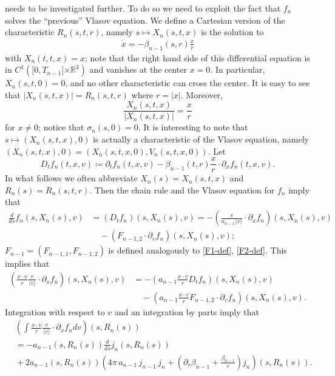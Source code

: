 \documentclass[11pt]{article}
\def\R{\mathbb R}
\def\p0{\langle v \rangle}
\begin{document}
needs to be investigated further.
To do so we need to exploit the fact that
$f_n$ solves the ``previous'' Vlasov equation.
We define a
Cartesian version of the characteristic $R_n(s,t,r)$, namely
$s\mapsto X_n(s,t,x)$ is the solution to
\begin{align}\label{X_nbeta}
\dot x = - \beta_{n-1}(s,r)\frac{x}{r}
\end{align}
with $X_n(t,t,x) = x$;
note that the right hand side of this differential equation
is in $C^1([0,T_{n-1}[\times \R^3)$ and vanishes at the center $x=0$. In
particular, $X_n(s,t,0)=0$, and no other characteristic can cross the center.
It is easy to see that $|X_n(s,t,x)|= R_n(s,t,r)$ where $r=|x|$.
Moreover,
\[
\frac{X_n(s,t,x)}{|X_n(s,t,x)|} = \frac{x}{r}
\]
for $x\neq 0$; notice that $\sigma_n(s,0)=0$.
It is interesting to note that $s\mapsto (X_n(s,t,x),0)$
is actually a characteristic
of the Vlasov equation, namely $(X_n(s,t,x),0)=(X_n(s,t,x,0),V_n(s,t,x,0))$.
Let
\[
D_t f_n(t,x,v) \coloneqq \partial_t f_n(t,x,v) -
\beta_{n-1}(t,r) \frac{x}{r}\cdot \partial_x f_n (t,x,v).
\]
In what follows we often abbreviate
$X_n(s) = X_n(s,t,x)$ and $R_n(s)=R_n(s,t,r)$.
Then the chain rule and the Vlasov equation for $f_n$ imply that
\begin{align*}
\frac{d}{ds} f_n(s,X_n(s),v)
&=
(D_t f_n)(s,X_n(s),v) =
-\left(\frac{v}{a_{n-1} \p0}\cdot \partial_x f_n\right)(s,X_n(s),v)\\
&\quad
{} - \left(F_{n-1,2} \cdot \partial_v f_n\right)(s,X_n(s),v);
\end{align*}
$F_{n-1} = (F_{n-1,1},F_{n-1,2})$ is defined analogously to
\eqref{F1-def}, \eqref{F2-def}. This implies that
\begin{align*}
\left(\frac{x\cdot v}{r} \frac{v}{\p0} \cdot
\partial_x f_n\right)(s,X_n(s),v)
&=
- \left(a_{n-1} \frac{x\cdot v}{r} D_t f_n\right)(s,X_n(s),v)\\
&\quad
{}- \left(a_{n-1} \frac{x\cdot v}{r} F_{n-1,2}
\cdot \partial_v f_n\right)(s,X_n(s),v).
\end{align*}
Integration with respect to $v$ and an integration by parts imply that
\begin{align*}
  &
  \left(\int \frac{x\cdot v}{r} \frac{v}{\p0} \cdot \partial_x f_n dv\right)
  (s,R_n(s))\\
  &=
  - a_{n-1}(s,R_n(s)) \frac{d}{ds} j_n(s,R_n(s))\\
  &
  {}+ 2 a_{n-1}(s,R_n(s))
  \left(4\pi \,a_{n-1}\, j_{n-1}\, j_n
  +\left(\partial_r\beta_{n-1} + \frac{\beta_{n-1}}{r}\right)
  j_n\right) (s,R_n(s)).
\end{align*}
\end{document}
